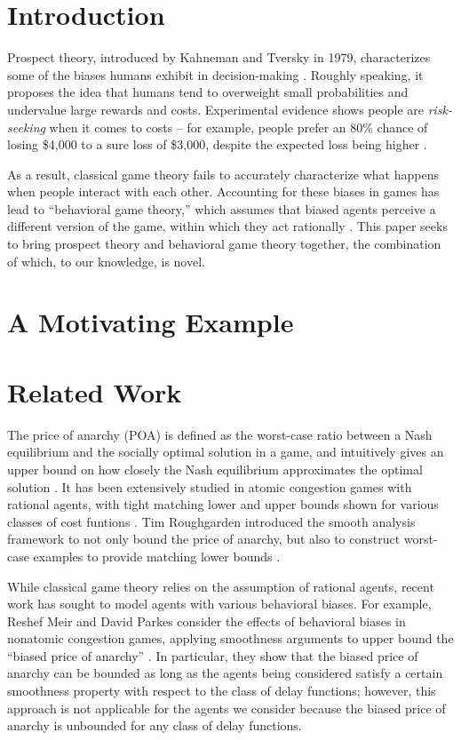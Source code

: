 \documentclass[twoside]{article}
\begin{document}
\begin{multicols}{2} %

\section{Introduction}
Prospect theory, introduced by Kahneman and Tversky in 1979, characterizes some
of the biases humans exhibit in decision-making \cite{Kahneman1979}. Roughly
speaking, it proposes the idea that humans tend to overweight small
probabilities and undervalue large rewards and costs. Experimental evidence
shows people are \textit{risk-seeking} when it comes to costs -- for example,
people prefer an 80\% chance of losing \$4,000 to a sure loss of \$3,000,
despite the expected loss being higher \cite{Kahneman1979}.

As a result, classical game theory fails to accurately characterize what happens
when people interact with each other. Accounting for these biases in games has
lead to ``behavioral game theory,'' which assumes that biased agents perceive a
different version of the game, within which they act rationally \cite{Meir2014}.
This paper seeks to bring prospect theory and behavioral game theory together,
the combination of which, to our knowledge, is novel.

\section{A Motivating Example}

\section{Related Work}
The price of anarchy (POA) is defined as the worst-case ratio between a Nash
equilibrium and the socially optimal solution in a game, and intuitively gives
an upper bound on how closely the Nash equilibrium approximates the optimal
solution \cite{Koutsoupias2009}. It has been extensively studied in atomic
congestion games with rational agents, with tight matching lower and upper
bounds shown for various classes of cost funtions
\cite{Aland2011,Roughgarden2012}. Tim Roughgarden introduced the smooth analysis
framework to not only bound the price of anarchy, but also to construct
worst-case examples to provide matching lower bounds \cite{Roughgarden2012}.

While classical game theory relies on the assumption of rational agents, recent
work has sought to model agents with various behavioral biases. For example,
Reshef Meir and David Parkes consider the effects of behavioral biases in
nonatomic congestion games, applying smoothness arguments to upper bound the
``biased price of anarchy'' \cite{Meir2014}. In particular, they show that the
biased price of anarchy can be bounded as long as the agents being considered
satisfy a certain smoothness property with respect to the class of delay
functions; however, this approach is not applicable for the agents we consider
because the biased price of anarchy is unbounded for any class of delay
functions.


\end{multicols}
\end{document}
